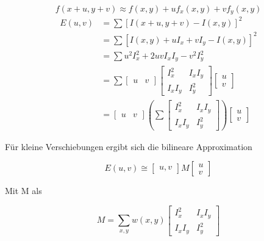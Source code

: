 %
\begin{equation}[!ht]
  f(x+u, y+v) \approx f(x,y) + uf_{x}(x,y) + vf_{y}(x,y)
\end{equation}
\begin{equation}
  \begin{aligned}
    E(u,v) &= \sum \left[ I(x+u, y+v) - I(x,y) \right]^2 \\
    &= \sum \left[ I(x,y) + uI_{x} + vI_{y} - I(x,y) \right]^2 \\
    &= \sum u^2I_{x}^2 + 2uvI_{x}I_{y}-v^2I_y^2\\
    &= \sum \begin{bmatrix} u & v \end{bmatrix} 
    \begin{bmatrix} I_x^2 & I_xI_y \\ I_xI_y & I_y^2 \end{bmatrix} 
    \begin{bmatrix}u \\v \end{bmatrix} \\
    &= \begin{bmatrix} u & v \end{bmatrix} \left(\sum 
    \begin{bmatrix} I_x^2 & I_xI_y \\ I_xI_y & I_y^2 \end{bmatrix} 
    \right) \begin{bmatrix}u \\v \end{bmatrix} 
  \end{aligned}
\end{equation}

Für kleine Verschiebungen ergibt sich die bilineare Approximation

\begin{equation}
  E(u,v) \cong \begin{bmatrix}
    u,v
  \end{bmatrix} M \begin{bmatrix}
    u\\ v
  \end{bmatrix}
\end{equation}

Mit M als

\begin{equation}
  M = \sum_{x,y} w(x,y)  
  \begin{bmatrix} I_x^2 & I_xI_y \\ I_xI_y & I_y^2 \end{bmatrix}  
\end{equation}

